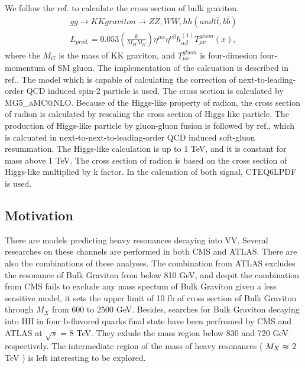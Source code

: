 We follow the ref.\citep{Agashe:2013kyb} to calculate the cross section of bulk graviton.
\begin{equation} \label{eq1}
\begin{split}
gg \rightarrow KK graviton \rightarrow ZZ, WW, hh (and t\bar{t}, b\bar{b}) \\
\textit{L}_{prod.} = 0.053 (\frac{k}{M_{Pl}M_{G}})\eta^{\mu\alpha}\eta^{\nu\beta}h^{(1)}_{\alpha\beta}T^{gluon}_{\mu \nu}(x), 
\end{split}
\end{equation}
where the $M_G$ is the mass of KK graviton, and $T^{gluon}_{\mu \nu}$ is four-dimesion four-momentum of SM gluon. The implementation of the calcuation is described in ref.\citep{Oliveira:2014kla}. The model which is capable of calculating the correction of next-to-leading-order QCD induced spin-2 particle is used. The cross section is calculated by \textsf{MG5\_aMC@NLO}.
Because of the Higgs-like property of radion, the cross section of radion is calculated by rescaling the cross section of Higgs like particle\citep{Agashe:2013kyb,AN-16-300}. The production of Higgs-like particle by gluon-gluon fusion is followed by ref.\citep{Catani:2003zt,Heinemeyer:2013tqa}, which is calcuated in next-to-next-to-leading-order QCD induced soft-gluon resummation. The Higgs-like calculation is up to 1 TeV, and it is constant for mass above 1 TeV. The cross section of radion is based on the cross section of Higgs-like multiplied by k factor. 
In the calcuation of both signal, CTEQ6LPDF is used\citep{Nadolsky:2008zw}.  

\subsection{Motivation} 
There are models predicting heavy resonances decaying into VV\citep{Brehmer:2015dan}.
Several researches on these channels are performed in both CMS and ATLAS.
There are also the combinations of these analyses\citep{Khachatryan:2014hpa,ATLASZV,ATLASWV,ATLASVV}.
The combination from ATLAS excludes the resonance of Bulk Graviton from below 810 GeV\citep{Aad:2015ipg}, and despit the combination from CMS fails to exclude any mass spectum of Bulk Graviton given a less sensitive model, it sets the upper limit of 10 fb of cross section of Bulk Graviton through $M_X$ from 600 to 2500 GeV\citep{CMSZVWV}.
Besides, searches for Bulk Graviton decaying into HH in four b-flavored quarks final state have been perfromed by CMS and ATLAS at $\sqrt{s}$ = 8 TeV\citep{Khachatryan:2015year,Aad:2015uka}. They exlude the mass region below 830 and 720 GeV respectively. The intermediate region of the mass of heavy resonances ( $M_X \thickapprox$ 2 TeV ) is left interesting to be explored.
 



